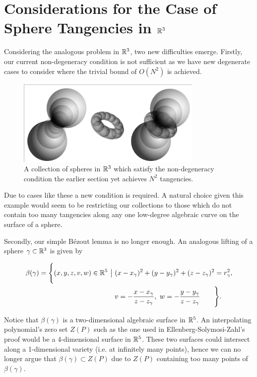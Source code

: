 \section[The Case of Sphere Tangencies in $\RR^{3}$]{Considerations for the Case of Sphere Tangencies in $\RR^{3}$}
Considering the analogous problem in $\RR^{3}$, two new difficulties emerge. 
Firstly, our current non-degeneracy condition is not sufficient as we have new degenerate cases to consider where the trivial bound of $O(N^2)$ is achieved. 
\begin{example}
    \begin{figure}[h]
        \centering 
        \includegraphics[width=0.8\textwidth]{images/degenr3.png}
        \caption{A collection of spheres in $\mathbb R^3$ which satisfy the non-degeneracy condition the earlier section yet achieves $N^2$ tangencies.}
        \end{figure}
\end{example}
Due to cases like these a new condition is required. 
A natural choice given this example would seem to be restricting our collections to those which do not contain too many tangencies 
along any one low-degree algebraic curve on the surface of a sphere. 

Secondly, our simple Bézout lemma is no longer enough. An analogous lifting of a sphere $\gamma \subset \mathbb R^3$ is given by

\begin{align*}
    \beta(\gamma) = \Biggl \{ (x,y,z,v,w) \in \RR^5 \  \big | \ &(x-x_\gamma)^2 + (y-y_\gamma)^2 + (z-z_\gamma)^2 = r_\gamma^2, \\
     &v = - \frac{x-x_\gamma}{z-z_\gamma}, \ w = - \frac{y-y_\gamma}{z-z_\gamma} \qquad  \Biggr \} .
\end{align*}


Notice that $\beta(\gamma)$ is a two-dimensional algebraic surface in $\mathbb R^5$. An interpolating polynomial's zero set $Z(P)$ such as the one used in Ellenberg-Solymosi-Zahl's proof would be a 4-dimensional surface in $\mathbb R^5$.
These two surfaces could intersect along a 1-dimensional variety (i.e. at infinitely many points), hence we can no longer argue that $\beta(\gamma) \subset Z(P)$ due to $Z(P)$ containing too many points of $\beta(\gamma)$.

